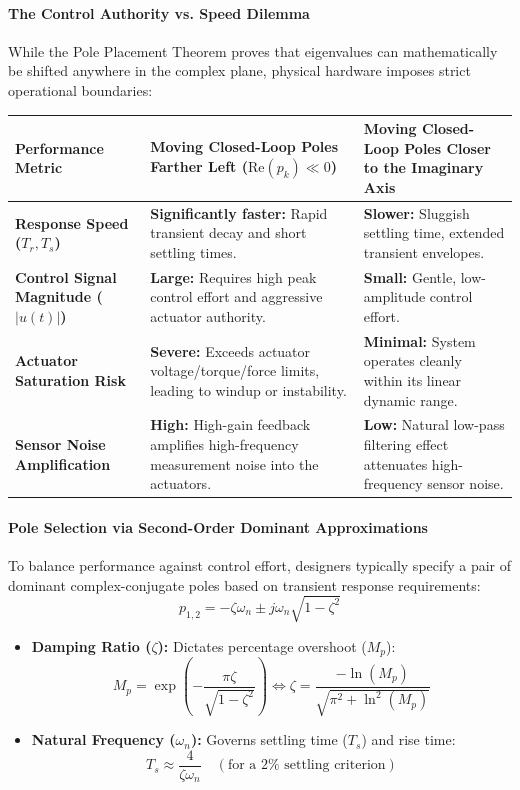 \documentclass[12pt,onecolumn,twoside ]{article}
\begin{document}
	\paragraph{The Control Authority vs. Speed Dilemma}
	While the Pole Placement Theorem proves that eigenvalues can mathematically be shifted anywhere in the complex plane, physical hardware imposes strict operational boundaries:
	\begin{center}\small\begin{tabularx}{\textwidth}{*{3}{Y}}
			\toprule
			\textbf{Performance Metric} & \textbf{Moving Closed-Loop Poles Farther Left ($\text{Re}(p_k) \ll 0$)} & \textbf{Moving Closed-Loop Poles Closer to the Imaginary Axis} \\
			\midrule
			\textbf{Response Speed ($T_r, T_s$)} & \textbf{Significantly faster:} Rapid transient decay and short settling times. & \textbf{Slower:} Sluggish settling time, extended transient envelopes. \\
			\textbf{Control Signal Magnitude ($\lvert u(t)\rvert$)} & \textbf{Large:} Requires high peak control effort and aggressive actuator authority. & \textbf{Small:} Gentle, low-amplitude control effort. \\
			\textbf{Actuator Saturation Risk} & \textbf{Severe:} Exceeds actuator voltage/torque/force limits, leading to windup or instability. & \textbf{Minimal:} System operates cleanly within its linear dynamic range. \\
			\textbf{Sensor Noise Amplification} & \textbf{High:} High-gain feedback amplifies high-frequency measurement noise into the actuators. & \textbf{Low:} Natural low-pass filtering effect attenuates high-frequency sensor noise. \\
			\bottomrule
	\end{tabularx}\end{center}
	\paragraph{Pole Selection via Second-Order Dominant Approximations}
	To balance performance against control effort, designers typically specify a pair of dominant complex-conjugate poles based on transient response requirements: \[
	p_{1,2} = -\zeta \omega_n \pm j \omega_n \sqrt{1 - \zeta^2}
	\]
	\begin{itemize}
		\item
		\textbf{Damping Ratio ($\zeta$):} Dictates percentage overshoot ($M_p$): \[
		M_p = \exp\left( -\frac{\pi \zeta}{\sqrt{1 - \zeta^2}} \right) \iff \zeta = \frac{-\ln(M_p)}{\sqrt{\pi^2 + \ln^2(M_p)}}
		\]
		\item
		\textbf{Natural Frequency ($\omega_n$):} Governs settling time ($T_s$) and rise time: \[
		T_s \approx \frac{4}{\zeta \omega_n} \quad (\text{for a } 2\% \text{ settling criterion})
		\]
	\end{itemize}
\end{document}
